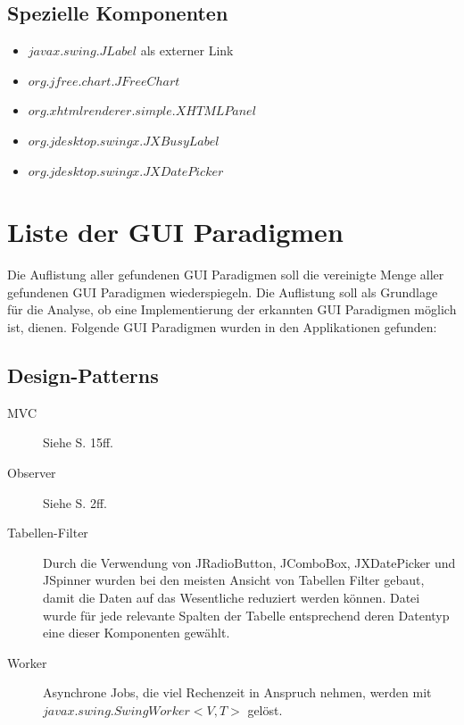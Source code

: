   \subsection{Spezielle Komponenten}
  
  \begin{itemize}
    \item \(javax.swing.JLabel\) als externer Link
    \item \(org.jfree.chart.JFreeChart\)
    \item \(org.xhtmlrenderer.simple.XHTMLPanel\)
    \item \(org.jdesktop.swingx.JXBusyLabel\)
    \item \(org.jdesktop.swingx.JXDatePicker\)
  \end{itemize}
  
  \section{Liste der GUI Paradigmen}
  
  Die Auflistung aller gefundenen GUI Paradigmen soll die vereinigte Menge aller
  gefundenen GUI Paradigmen wiederspiegeln. Die Auflistung soll als Grundlage für
  die Analyse, ob eine Implementierung der erkannten GUI Paradigmen möglich
  ist, dienen. Folgende GUI Paradigmen wurden in den Applikationen gefunden:
      
  \subsection{Design-Patterns}
  
  \begin{description}
    \item[MVC]
    Siehe \cite{GUIDesignPatterns} S. 15ff.
    \item[Observer]
    Siehe \cite{GUIDesignPatterns} S. 2ff.
    \item[Tabellen-Filter]
    Durch die Verwendung von JRadioButton, JComboBox, JXDatePicker und JSpinner
    wurden bei den meisten Ansicht von Tabellen Filter gebaut, damit die Daten
    auf das Wesentliche reduziert werden können. Datei wurde für jede relevante
    Spalten der Tabelle entsprechend deren Datentyp eine dieser Komponenten
    gewählt.
    \item[Worker]
    Asynchrone Jobs, die viel Rechenzeit in Anspruch nehmen, werden mit
    \(javax.swing.SwingWorker<V,T>\) gelöst.
  \end{description}
  
